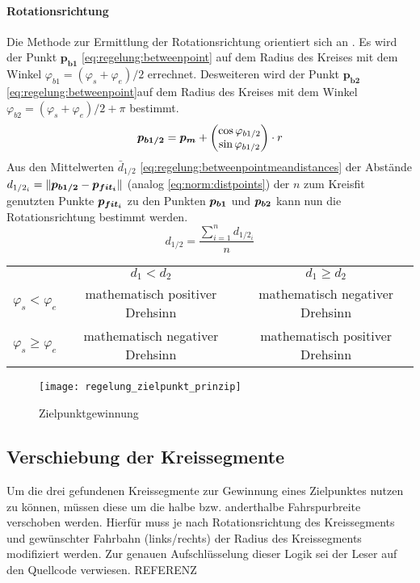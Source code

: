 \paragraph{Rotationsrichtung}
Die Methode zur Ermittlung der Rotationsrichtung orientiert sich an \autocite{drauschkeEchtzeitfaehigeStartpunktalgorithmenFuer2016}. Es wird der Punkt \(\boldsymbol{p_{b1}}\) \eqref{eq:regelung:betweenpoint} auf dem Radius des Kreises mit dem Winkel \(  \varphi_{b1} = (\varphi_s + \varphi_e)/2 \) errechnet.
Desweiteren wird der Punkt \(\boldsymbol{p_{b2}}\) \eqref{eq:regelung:betweenpoint}auf dem Radius des Kreises mit dem Winkel \(  \varphi_{b2} = (\varphi_s + \varphi_e)/2 + \pi \) bestimmt.
\begin{equation} \label{eq:regelung:betweenpoint}
\boldsymbol{p_{b1/2}} = \boldsymbol{p_m} + 
\begin{pmatrix}
\cos{\varphi_{b1/2}} \\
\sin{\varphi_{b1/2}}
\end{pmatrix}
\cdot r
\end{equation}
Aus den Mittelwerten \( \bar{d}_{1/2} \) \eqref{eq:regelung:betweenpointmeandistances} der Abstände \( d_{1/2_i} = \| \boldsymbol{p_{b1/2}} - \boldsymbol{p_{fit_i}}\| \) (analog \ref{eq:norm:distpoints}) der \(n\) zum Kreisfit genutzten Punkte \(\boldsymbol{p_{fit_i}}\) zu den Punkten \(\boldsymbol{p_{b1}}\) und \(\boldsymbol{p_{b2}}\) kann nun die Rotationsrichtung bestimmt werden.
\begin{equation} \label{eq:regelung:betweenpointmeandistances}
d_{1/2} = \frac{\sum_{i=1}^n d_{1/2_i}}{n} 
\end{equation}
\begin{tabular}{ccc}
& \(d_1<d_2\) & \(d_1\geq d_2\) \\
\(\varphi_s<\varphi_e\) &  mathematisch positiver Drehsinn & mathematisch negativer Drehsinn \\
\(\varphi_s\geq \varphi_e\) &  mathematisch negativer Drehsinn & mathematisch positiver Drehsinn
\end{tabular}

\begin{figure}[htb]
  \centering
  \texttt{[image: regelung\_zielpunkt\_prinzip]}
  \caption{Zielpunktgewinnung}
  \label{fig:regelung:zielpunkt:zielpunktgewinnung}
\end{figure}

\subsection{Verschiebung der Kreissegmente}
Um die drei gefundenen Kreissegmente zur Gewinnung eines Zielpunktes nutzen zu können, müssen diese um die halbe bzw. anderthalbe Fahrspurbreite verschoben werden. Hierfür muss je nach Rotationsrichtung des Kreissegments und gewünschter Fahrbahn (links/rechts) der Radius des Kreissegments modifiziert werden. Zur genauen Aufschlüsselung dieser Logik sei der Leser auf den Quellcode verwiesen. REFERENZ

